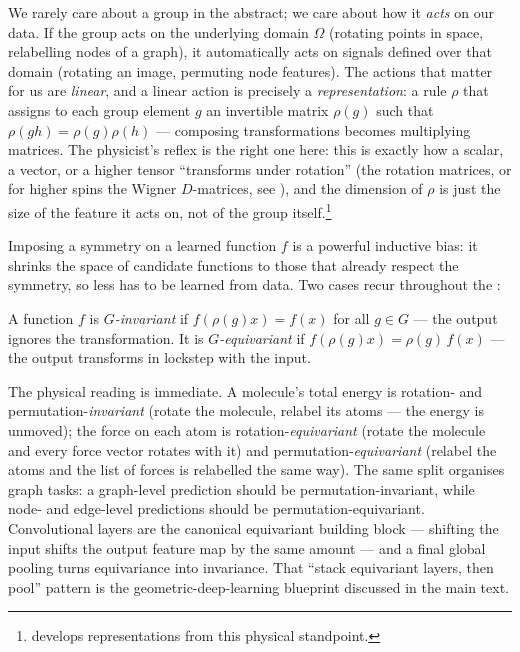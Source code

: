  We rarely care about a group in the abstract; we care about how it \emph{acts} on our data. If the group acts on the underlying domain $\Omega$ (rotating points in space, relabelling nodes of a graph), it automatically acts on signals defined over that domain (rotating an image, permuting node features). The actions that matter for us are \emph{linear}, and a linear action is precisely a \emph{representation}: a rule $\rho$ that assigns to each group element $g$ an invertible matrix $\rho(g)$ such that $\rho(gh)=\rho(g)\rho(h)$ --- composing transformations becomes multiplying matrices. The physicist's reflex is the right one here: this is exactly how a scalar, a vector, or a higher tensor ``transforms under rotation'' (the rotation matrices, or for higher spins the Wigner $D$-matrices, see \citet{Zee2016_grouptheory_nutshell}), and the dimension of $\rho$ is just the size of the feature it acts on, not of the group itself.\footnote{\citet{Zee2016_grouptheory_nutshell} develops representations from this physical standpoint.}

 Imposing a symmetry on a learned function $f$ is a powerful inductive bias: it shrinks the space of candidate functions to those that already respect the symmetry, so less has to be learned from data. Two cases recur throughout the \chapterorreview{}:

\begin{definition}\sloppy
A function $f$ is \emph{$G$-invariant} if $f(\rho(g)x) = f(x)$ for all $g\in G$ --- the output ignores the transformation. It is \emph{$G$-equivariant} if $f(\rho(g)x) = \rho(g)\,f(x)$ --- the output transforms in lockstep with the input.
\end{definition}

The physical reading is immediate. A molecule's total energy is rotation- and permutation-\emph{invariant} (rotate the molecule, relabel its atoms --- the energy is unmoved); the force on each atom is rotation-\emph{equivariant} (rotate the molecule and every force vector rotates with it) and permutation-\emph{equivariant} (relabel the atoms and the list of forces is relabelled the same way). The same split organises graph tasks: a graph-level prediction should be permutation-invariant, while node- and edge-level predictions should be permutation-equivariant. Convolutional layers are the canonical equivariant building block --- shifting the input shifts the output feature map by the same amount --- and a final global pooling turns equivariance into invariance. That ``stack equivariant layers, then pool'' pattern is the geometric-deep-learning blueprint discussed in the main text.

